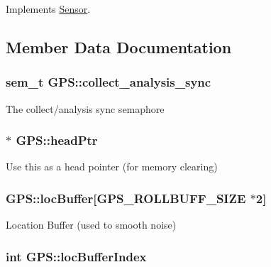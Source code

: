 Implements \hyperlink{classSensor_acf4ff5c6c8f793ed47a8105b94ff7c3e}{Sensor}.



\subsection{Member Data Documentation}
\hypertarget{classGPS_ab0d29060e79b34b84fa06847a36de2e7}{
\subsubsection[{collect\-\_\-analysis\-\_\-sync}]{\setlength{\rightskip}{0pt plus 5cm}sem\-\_\-t G\-P\-S\-::collect\-\_\-analysis\-\_\-sync\hspace{0.3cm}{\ttfamily [protected]}}}\label{classGPS_ab0d29060e79b34b84fa06847a36de2e7}
The collect/analysis sync semaphore \hypertarget{classGPS_ad1fea42571de73f9b9278cc329490457}{
\subsubsection[{head\-Ptr}]{$\ast$ G\-P\-S\-::head\-Ptr\hspace{0.3cm}{\ttfamily [protected]}}}\label{classGPS_ad1fea42571de73f9b9278cc329490457}
Use this as a head pointer (for memory clearing) \hypertarget{classGPS_a78bd0e171c43d44a60349cba2d05f29b}{
\subsubsection[{loc\-Buffer}]{ G\-P\-S\-::loc\-Buffer\mbox{[}G\-P\-S\-\_\-\-R\-O\-L\-L\-B\-U\-F\-F\-\_\-\-S\-I\-Z\-E $\ast$2\mbox{]}\hspace{0.3cm}{\ttfamily [protected]}}}\label{classGPS_a78bd0e171c43d44a60349cba2d05f29b}
Location Buffer (used to smooth noise) \hypertarget{classGPS_a8a593af52417cf88df7c6c7172d7caf7}{
\subsubsection[{loc\-Buffer\-Index}]{\setlength{\rightskip}{0pt plus 5cm}int G\-P\-S\-::loc\-Buffer\-Index\hspace{0.3cm}{\ttfamily [protected]}}}\label{classGPS_a8a593af52417cf88df7c6c7172d7caf7}
